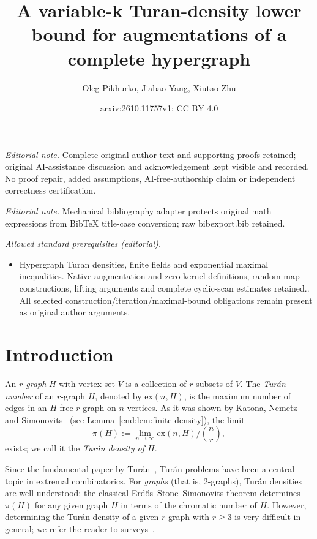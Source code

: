 \documentclass[10pt,a4paper]{article}
\title{A variable-k Turan-density lower bound for augmentations of a complete hypergraph}
\author{Oleg Pikhurko, Jiabao Yang, Xiutao Zhu}
\date{arxiv:2610.11757v1; CC BY 4.0}
\numberwithin{equation}{section}
\theoremstyle{definition}
\theoremstyle{remark}
\begin{document}
\maketitle
\noindent\textit{Editorial note.} Complete original author text and supporting proofs retained; original AI-assistance discussion and acknowledgement kept visible and recorded. No proof repair, added assumptions, AI-free-authorship claim or independent correctness certification.\par\medskip
\noindent\textit{Editorial note.} Mechanical bibliography adapter protects original math expressions from BibTeX title-case conversion; raw bibexport.bib retained.\par\medskip
\noindent\textit{Allowed standard prerequisites (editorial).}\begin{itemize}
\item Hypergraph Turan densities, finite fields and exponential maximal inequalities. Native augmentation and zero-kernel definitions, random-map constructions, lifting arguments and complete cyclic-scan estimates retained.. All selected construction/iteration/maximal-bound obligations remain present as original author arguments.
\end{itemize}\medskip
\section{Introduction}

An \emph{$r$-graph} $H$ with vertex set $V$ is a collection of $r$-subsets of $V$. The {\em Tur\'{a}n number} of an $r$-graph $H$, denoted by $\mathrm{ex}(n,H)$, is the maximum number of edges in an $H$-free $r$-graph on $n$ vertices. 
As it was shown by Katona, Nemetz and Simonovits~\cite{KatonaNemetzSimonovits64} (see Lemma~\ref{end:lem:finite-density}), the limit
\[
\pi(H):=\lim_{n\to\infty} \mathrm{ex}(n,H)/\binom {n}{r},
\]
 exists; we call it the \emph{Tur\'an density of $H$}.

Since the fundamental paper by Tur\'an~\cite{Turan41}, Tur\'an problems have been a central topic in extremal combinatorics. For \emph{graphs} (that is, $2$-graphs), Tur\'an densities are well understood: the classical Erd\H{o}s--Stone--Simonovits theorem \cite{ErdosStone46,ErdosSimonovits66} determines $\pi(H)$ for any given graph $H$ in terms of the chromatic number of $H$. However, determining the Tur\'an density of a given $r$-graph with $r\ge 3$ is very difficult in general; we refer the reader to surveys~\cite{Furedi91,Decaen94,Sidorenko95,Keevash11}. 
\end{document}
